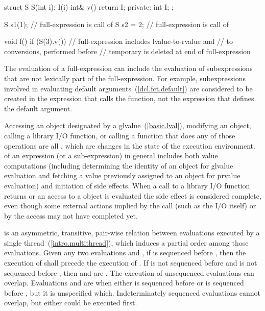 \enterexample
\begin{codeblock}
struct S {
  S(int i): I(i) { }
  int& v() { return I; }
private:
  int I;
};

 S s1(1);           // full-expression is call of 
 S s2 = 2;          // full-expression is call of 

void f() {
  if (S(3).v())     // full-expression includes lvalue-to-rvalue and
                    //  to  conversions, performed before
                    // temporary is deleted at end of full-expression
  { }
}
\end{codeblock}
\exitexample

\pnum
\enternote The evaluation of a full-expression can include the
evaluation of subexpressions that are not lexically part of the
full-expression. For example, subexpressions involved in evaluating
default arguments~(\ref{dcl.fct.default}) are considered to
be created in the expression that calls the function, not the expression
that defines the default argument. \exitnote

\pnum
{}%
Accessing an object designated by a 
glvalue~(\ref{basic.lval}), modifying an object, calling a library I/O
function, or calling a function that does any of those operations are
all
, which are changes in the state of the execution
environment.  of an expression (or a
sub-expression) in general includes both value computations (including
determining the identity of an object for glvalue evaluation and fetching
a value previously assigned to an object for prvalue evaluation) and
initiation of side effects. When a call to a library I/O function
returns or an access to a  object is evaluated the side
effect is considered complete, even though some external actions implied
by the call (such as the I/O itself) or by the  access
may not have completed yet.

\pnum
{} is an asymmetric, transitive, pair-wise relation between
evaluations executed by a single thread~(\ref{intro.multithread}), which induces
a partial order among those evaluations. Given any two evaluations  and
, if  is sequenced before , then the execution of
 shall precede the execution of . If  is not sequenced
before  and  is not sequenced before , then  and
 are . \enternote The execution of unsequenced
evaluations can overlap. \exitnote Evaluations  and  are
 when either  is sequenced before
 or  is sequenced before , but it is unspecified which.
\enternote Indeterminately sequenced evaluations cannot overlap, but either
could be executed first. \exitnote

